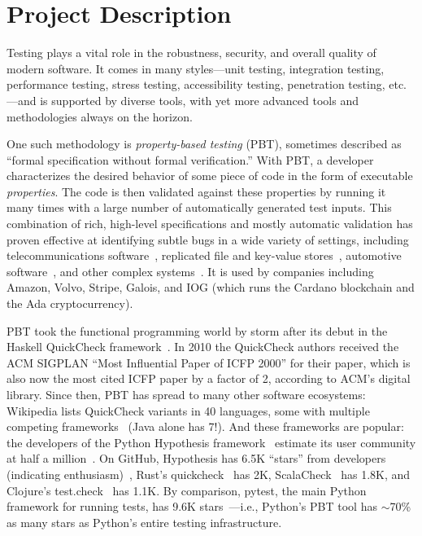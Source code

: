 \section*{Project Description}

Testing plays a vital role in the robustness, security, and overall
quality of modern software. It comes in many styles---unit testing,
integration testing, performance testing, stress testing,
accessibility testing, penetration testing, etc.---and is supported by
diverse tools, with yet more advanced tools and methodologies always on
the horizon.

One such methodology is {\em property-based testing} (PBT),
sometimes described as ``formal specification without formal
verification.''  With PBT, a developer characterizes the desired
behavior of
some piece of code in the form of executable {\em
  properties}. The code is
then validated against these properties by running it many times
with a large number of automatically generated test
inputs.
%
This combination of rich, high-level specifications and mostly
automatic validation has proven effective at identifying
subtle bugs in a wide variety of settings, including
telecommunications software~\cite{arts2006testing}, replicated
file and key-value
stores~\cite{MysteriesOfDropbox2016,Bornholt2021}, automotive
software~\cite{arts2015testing}, and other complex
systems~\cite{hughes_experiences_2016}.
It is used by companies including Amazon, Volvo, Stripe, Galois,
and IOG (which
runs the Cardano blockchain and the Ada cryptocurrency).

PBT took the functional programming world by storm after its
debut in the Haskell QuickCheck framework~\cite{ClaessenHughes00}.  In
2010 the
QuickCheck authors received the ACM SIGPLAN ``Most Influential Paper of ICFP
2000'' for their paper, which is also now the most cited
ICFP paper by
a factor of 2, according to ACM's digital library.  Since then,
PBT has spread to many other software ecosystems:
%
Wikipedia lists QuickCheck variants in 40 languages, some
with multiple competing frameworks~\cite{QuickCheckWikipedia} (Java alone has
7!).
%
And these frameworks are popular:
the developers of the Python Hypothesis framework~\cite{maciver2019hypothesis,HypothesisGithub} estimate its user community
at half a million~\cite{ZacPersonalCommunication,noauthor_python_nodate}.  On GitHub,
Hypothesis has 6.5K ``stars'' from developers (indicating enthusiasm)~\cite{borges_whats_2018}, Rust's
quickcheck~\cite{RustQuickcheckGithub} has 2K,
ScalaCheck~\cite{ScalaCheckGithub} has 1.8K, and Clojure's
test.check~\cite{ClojureTest.checkGithub} has 1.1K.
By comparison, pytest, the main Python framework for running
tests, has 9.6K stars~\cite{PytestGitHub}---i.e., Python's
PBT tool has $\sim$70\% as many stars as Python's entire testing
infrastructure. \iflater{}\fi

